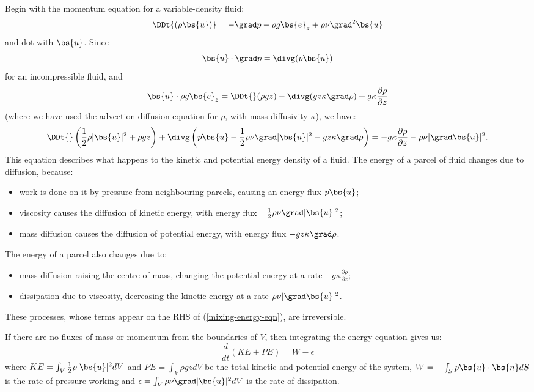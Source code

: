Begin with the momentum equation for a variable-density fluid:
\begin{equation}
    \DDt{(\rho\bs{u})} = -\grad p - \rho g \bs{e}_z + \rho\nu\grad^2\bs{u}
\end{equation}
and dot with $\bs{u}$. Since
\begin{equation}
    \bs{u}\cdot\grad p = \divg(p\bs{u})
\end{equation}
for an incompressible fluid, and 
\begin{equation}
    \bs{u}\cdot\rho g \bs{e}_z = \DDt{}(\rho gz) - \divg(gz\kappa\grad\rho) +
    g\kappa\frac{\partial\rho}{\partial z}
\end{equation}
(where we have used the advection-diffusion equation for $\rho$, with mass
diffusivity $\kappa$), we have:
\begin{equation}
    \DDt{}\left(\frac{1}{2}\rho|\bs{u}|^2 + \rho gz\right)
    + \divg\left(p\bs{u} - \frac{1}{2}\rho\nu\grad|\bs{u}|^2 
       - gz\kappa\grad\rho\right)
    = -g\kappa\frac{\partial\rho}{\partial z} 
    - \rho\nu|\grad\bs{u}|^2.
    \label{mixing-energy-eqn}
\end{equation}
This equation describes what happens to the kinetic and potential energy density of a fluid. The energy of a parcel of fluid changes due to diffusion, because:
\begin{itemize}
    \item work is done on it by pressure from neighbouring parcels, causing an
        energy flux $p\bs{u}$; 
    \item viscosity causes the diffusion of kinetic energy, with energy flux
        $-\frac{1}{2}\rho\nu\grad|\bs{u}|^2$;
    \item mass diffusion causes the diffusion of potential energy, with energy
        flux $- gz\kappa\grad\rho$.
\end{itemize}
The energy of a parcel also changes due to:
\begin{itemize}
    \item mass diffusion raising the centre of mass, changing the potential
        energy at a rate $-g\kappa\frac{\partial\rho}{\partial z}$;
    \item dissipation due to viscosity, decreasing the kinetic energy at a rate
        $\rho\nu|\grad\bs{u}|^2$.
\end{itemize}
These processes, whose terms appear on the RHS of (\ref{mixing-energy-eqn}), are
irreversible.

If there are no fluxes of mass or momentum from the boundaries of $V$, then
integrating the energy equation gives us:
\begin{equation}
    \frac{d}{dt}(KE + PE) = W-\epsilon
\end{equation}
where $KE = \int_V \frac{1}{2}\rho|\bs{u}|^2 dV$ and $PE = \int_V \rho gz dV$ be
the total kinetic and potential energy of the system, $W = -\int_S p
\bs{u}\cdot\bs{n} dS$ is the rate of pressure working and $\epsilon = \int_V
\rho\nu\grad|\bs{u}|^2 dV$ is the rate of dissipation.


